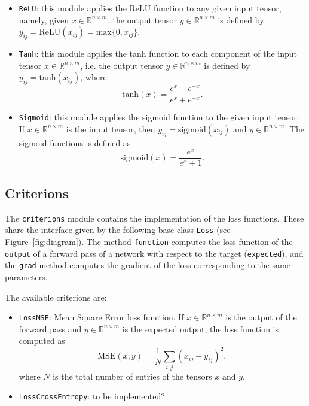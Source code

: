 \documentclass[10pt,final,a4paper]{article}
\begin{document}
\begin{itemize}
\begin{itemize}[label={$\diamond$}]
\item \verb|ReLU|:  this module applies the ReLU function to any given input tensor, namely, given $x \in \mathbb{R}^{n \times m}$, the output tensor $y \in \mathbb{R}^{n \times m}$ is defined by $y_{ij} = \text{ReLU}(x_{ij}) = \text{max}\{0, x_{ij}\}$.
\item \verb|Tanh|: this module applies the tanh function to each component of the input tensor $x \in \mathbb{R}^{n \times m}$, i.e. the output tensor  $y \in \mathbb{R}^{n \times m}$ is defined by $y_{ij} = \text{tanh}(x_{ij})$, where
\begin{equation*}
\text{tanh}(x) = \dfrac{e^x - e^{-x}}{e^{x} + e^{-x}}.
\end{equation*}
\item \verb|Sigmoid|: this module applies the sigmoid function to the given input tensor. If $x \in \mathbb{R}^{n \times m}$ is the input tensor, then $y_{ij} = \text{sigmoid}(x_{ij})$ and $y \in \mathbb{R}^{n \times m}$. The sigmoid functions is defined as
\begin{equation*}
\text{sigmoid}(x) = \dfrac{e^x}{e^x + 1}.
\end{equation*}
\end{itemize}
\end{itemize}
\subsection{Criterions}
The \verb|criterions| module contains the implementation of the loss functions. These share the interface given by the following base class \verb|Loss| (see Figure~\ref{fig:diagram}). The method \verb|function| computes the loss function of the \verb|output| of a forward pass of a network with respect to the target (\verb|expected|), and the \verb|grad| method computes the gradient of the loss corresponding to the same parameters.

The available criterions are:
\begin{itemize}
\item \verb|LossMSE|: Mean Square Error loss function. If $x \in \mathbb{R}^{n \times m}$ is the output of the forward pass and $y \in \mathbb{R}^{n \times m}$ is the expected output, the loss function is computed as
\begin{equation*}
\text{MSE}(x,y) = \dfrac{1}{N} \sum_{i,j} (x_{ij} - y_{ij})^2,
\end{equation*} 
where $N$ is the total number of entries of the tensors $x$ and $y$.
\item \verb|LossCrossEntropy|: to be implemented?
\end{itemize}
\end{document}
